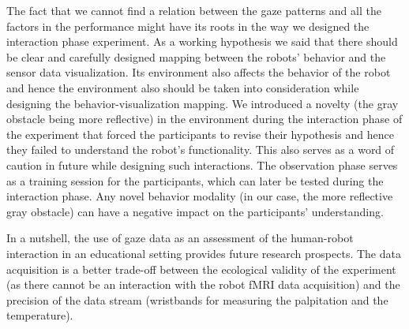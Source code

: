 \documentclass{sig-alternate}
\begin{document}
The fact that we cannot find a relation between the gaze patterns and
all the factors in the performance might have its roots in the way we
designed the interaction phase experiment. As a working hypothesis we
said that there should be clear and carefully designed mapping between
the robots' behavior and the sensor data visualization. Its environment
also affects the behavior of the robot and hence the environment also
should be taken into consideration while designing the
behavior-visualization mapping. We introduced a novelty (the gray
obstacle being more reflective) in the environment during the
interaction phase of the experiment that forced the participants to
revise their hypothesis and hence they failed to understand the robot's
functionality. This also serves as a word of caution in future while
designing such interactions. The observation phase serves as a training
session for the participants, which can later be tested during the
interaction phase. Any novel behavior modality (in our case, the more
reflective gray obstacle) can have a negative impact on the
participants' understanding.

In a nutshell, the use of gaze data as an assessment of the human-robot
interaction in an educational setting provides future research
prospects. The data acquisition is a better trade-off between the
ecological validity of the experiment (as there cannot be an interaction
with the robot fMRI data acquisition) and the precision of the data
stream (wristbands for measuring the palpitation and the temperature).



%




\balancecolumns
\end{document}
